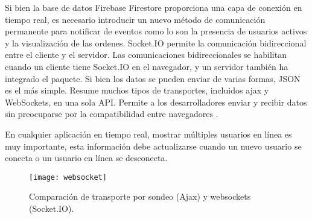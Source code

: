 Si bien la base de datos Firebase Firestore proporciona una capa de conexión en tiempo real, es necesario introducir un nuevo método de comunicación permanente para notificar de eventos como lo son la presencia de usuarios activos y la visualización de las ordenes. Socket.IO permite la comunicación bidireccional entre el cliente y el servidor. Las comunicaciones bidireccionales se habilitan cuando un cliente tiene Socket.IO en el navegador, y un servidor también ha integrado el paquete. Si bien los datos se pueden enviar de varias formas, JSON es el más simple. Resume muchos tipos de transportes, incluidos \acrshort{ajax}  y WebSockets, en una sola API. Permite a los desarrolladores enviar y recibir datos sin preocuparse por la compatibilidad entre navegadores \cite{kelleher}.
\vspace{0.8cm}

En cualquier aplicación en tiempo real, mostrar múltiples usuarios en línea es muy importante, esta información debe actualizarse cuando un nuevo usuario se conecta o un usuario en línea se desconecta.
\vspace{0.8cm}

\begin{figure}[H]
  \centering
  \texttt{[image: websocket]}
  \caption{Comparación de transporte por sondeo (Ajax) y websockets (Socket.IO).}
\end{figure}

